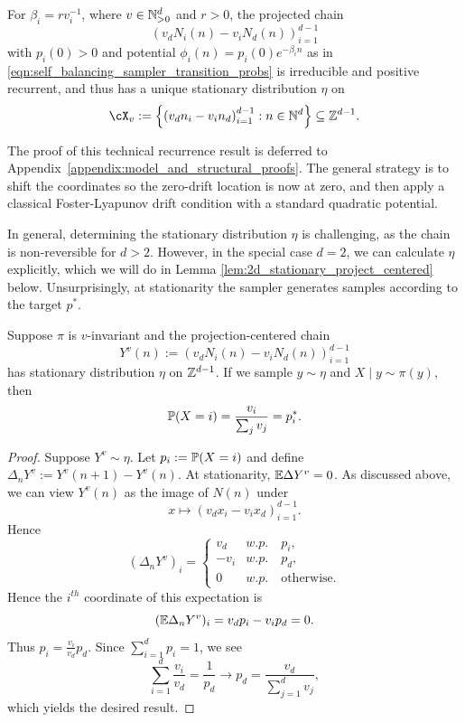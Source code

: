 \begin{lemma}
\label{lem:projection_centered_has_stationarity}
    For $\beta_i=rv_i^{-1}$, where $v\in\N_{>0}^d$ and $r>0$, the projected chain
    \[
        \left(v_dN_i(n)-v_iN_d(n)\right)_{i=1}^{d-1}
    \]
    \noindent with $p_i(0)>0$ and potential $\phi_i(n) = p_i(0)e^{-\beta_i n}$ as in \eqref{eqn:self_balancing_sampler_transition_probs}
    is irreducible and positive recurrent, and thus has a unique stationary
    distribution $\eta$ on
    \[
        \cX_v := \left\{\left(v_d n_i-v_i n_d\right)_{i=1}^{d-1}:n\in\N^d\right\}
        \subseteq\Z^{d-1}.
    \]
\end{lemma}
%
The proof of this technical recurrence result is deferred to Appendix~\ref{appendix:model_and_structural_proofs}. 
The general strategy is to shift the coordinates so the zero-drift location is now at zero, and then apply a classical 
Foster-Lyapunov drift condition with a standard quadratic potential.

In general, determining the stationary distribution $\eta$ is challenging, as the chain is non-reversible for $d > 2$.
However, in the special case $d=2$, we can calculate $\eta$ explicitly, which we will do in Lemma \ref{lem:2d_stationary_project_centered} below. 
Unsurprisingly, at stationarity the  sampler generates samples according to the target $p^*$.

\begin{lemma}
\label{lem:sampling_at_stationarity_gives_pstar}
Suppose $\pi$ is $v$-invariant and the projection-centered chain
%
    \[Y^v(n) := (v_dN_i(n) - v_i N_d(n))_{i=1}^{d-1}\]
%
has stationary distribution $\eta$ on $\Z^{d-1}$.
 If we sample $y \sim \eta$ and $X \mid y \sim \pi(y)$, then
    \[\P(X = i) = \frac{v_i}{\sum_j v_j} = p_i^*.\]
\end{lemma}

\begin{proof}
    Suppose $Y^v \sim \eta$. Let $p_i := \P(X = i)$ and define $\Delta_n Y^v := Y^v(n+1) - Y^v(n)$. At stationarity, $\E \Delta Y^v = 0$.
    As discussed above, we can view $Y^v(n)$ as the image of $N(n)$ under
    \[x \mapsto (v_dx_i - v_ix_d)_{i=1}^{d-1}.\]
    \noindent Hence
    \[(\Delta_n Y^v)_i = \begin{cases}
        v_d & w.p. \quad p_i,\\
        -v_i & w.p. \quad p_d,\\
        0 & w.p. \quad \text{otherwise}.
    \end{cases}\]
    \noindent Hence the $i^{th}$ coordinate of this expectation is
    \[(\E \Delta_n Y^v)_i = v_dp_i - v_ip_d = 0.\]
    \noindent Thus $p_i = \frac{v_i}{v_d}p_d$. Since $\sum_{i=1}^d p_i = 1$, we see
    \[\sum_{i=1}^d \frac{v_i}{v_d} = \frac{1}{p_d} \to p_d = \frac{v_d}{\sum_{j=1}^d v_j},\]
    \noindent which yields the desired result.
\end{proof}




